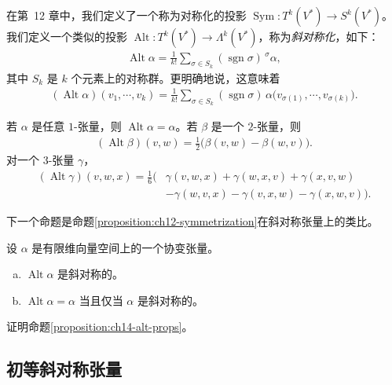 \documentclass[../../main.tex]{subfiles}
\begin{document}
在第~12 章中，我们定义了一个称为对称化的投影 $\operatorname{Sym}:T^k(V^*)\to S^k(V^*)$。我们定义一个类似的投影 $\operatorname{Alt}:T^k(V^*)\to\Lambda^k(V^*)$，称为\emph{斜对称化}，如下：
\begin{align*}
\operatorname{Alt}\alpha=\frac1{k!}\sum_{\sigma\in S_k}(\operatorname{sgn}\sigma)\,{}^\sigma\alpha,
\end{align*}
其中 $S_k$ 是 $k$ 个元素上的对称群。更明确地说，这意味着
\begin{align*}
(\operatorname{Alt}\alpha)(v_1,\cdots ,v_k)
=\frac1{k!}\sum_{\sigma\in S_k}(\operatorname{sgn}\sigma)\,
\alpha\bigl(v_{\sigma(1)},\cdots ,v_{\sigma(k)}\bigr).
\end{align*}

\begin{example}\label{example:ch14-alt}
若 $\alpha$ 是任意 $1$-张量，则 $\operatorname{Alt}\alpha=\alpha$。若 $\beta$ 是一个 $2$-张量，则
\begin{align*}
(\operatorname{Alt}\beta)(v,w)=\frac12\bigl(\beta(v,w)-\beta(w,v)\bigr).
\end{align*}
对一个 $3$-张量 $\gamma$，
\begin{align*}
(\operatorname{Alt}\gamma)(v,w,x)=\frac16\bigl(&\gamma(v,w,x)+\gamma(w,x,v)+\gamma(x,v,w)\\
&-\gamma(w,v,x)-\gamma(v,x,w)-\gamma(x,w,v)\bigr).
\end{align*}
\end{example}

下一个命题是命题\ref{proposition:ch12-symmetrization}在斜对称张量上的类比。

\begin{proposition}[斜对称化的性质]\label{proposition:ch14-alt-props}
设 $\alpha$ 是有限维向量空间上的一个协变张量。
\begin{enumerate}[(a)]
\item $\operatorname{Alt}\alpha$ 是斜对称的。
\item $\operatorname{Alt}\alpha=\alpha$ 当且仅当 $\alpha$ 是斜对称的。
\end{enumerate}
\end{proposition}

\begin{exercise}\label{exercise:ch14-04}
证明命题\ref{proposition:ch14-alt-props}。
\end{exercise}

\subsection{初等斜对称张量}
\end{document}
